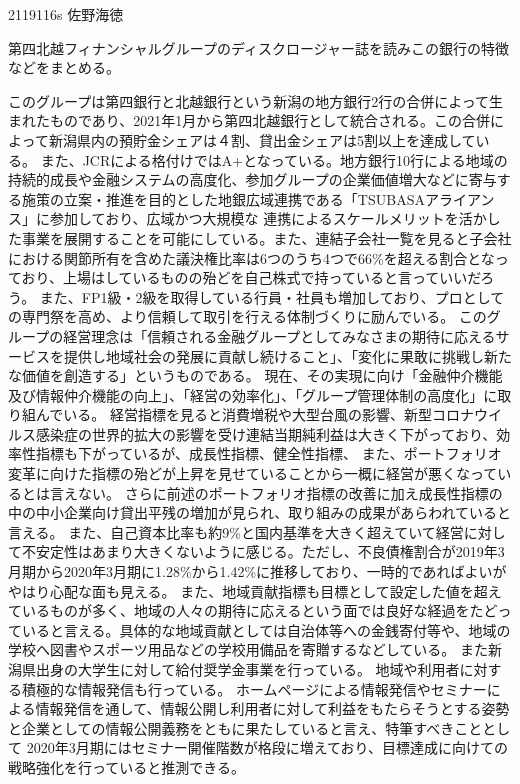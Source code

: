 \documentclass[11pt]{jsarticle}
\begin{document}
    2119116s 佐野海徳
    \par 第四北越フィナンシャルグループのディスクロージャー誌を読みこの銀行の特徴などをまとめる。
    \par このグループは第四銀行と北越銀行という新潟の地方銀行2行の合併によって生まれたものであり、2021年1月から第四北越銀行として統合される。この合併によって新潟県内の預貯金シェアは４割、貸出金シェアは5割以上を達成している。
    また、JCRによる格付けではA+となっている。地方銀行10行による地域の持続的成長や金融システムの高度化、参加グループの企業価値増大などに寄与する施策の立案・推進を目的とした地銀広域連携である「TSUBASAアライアンス」に参加しており、広域かつ大規模な
    連携によるスケールメリットを活かした事業を展開することを可能にしている。また、連結子会社一覧を見ると子会社における関節所有を含めた議決権比率は6つのうち4つで66\%を超える割合となっており、上場はしているものの殆どを自己株式で持っていると言っていいだろう。
    また、FP1級・2級を取得している行員・社員も増加しており、プロとしての専門祭を高め、より信頼して取引を行える体制づくりに励んでいる。
    このグループの経営理念は「信頼される金融グループとしてみなさまの期待に応えるサービスを提供し地域社会の発展に貢献し続けること」、「変化に果敢に挑戦し新たな価値を創造する」というものである。
    現在、その実現に向け「金融仲介機能及び情報仲介機能の向上」、「経営の効率化」、「グループ管理体制の高度化」に取り組んでいる。
    経営指標を見ると消費増税や大型台風の影響、新型コロナウイルス感染症の世界的拡大の影響を受け連結当期純利益は大きく下がっており、効率性指標も下がっているが、成長性指標、健全性指標、
    また、ポートフォリオ変革に向けた指標の殆どが上昇を見せていることから一概に経営が悪くなっているとは言えない。
    さらに前述のポートフォリオ指標の改善に加え成長性指標の中の中小企業向け貸出平残の増加が見られ、取り組みの成果があらわれていると言える。
    また、自己資本比率も約9\%と国内基準を大きく超えていて経営に対して不安定性はあまり大きくないように感じる。ただし、不良債権割合が2019年3月期から2020年3月期に1.28\%から1.42\%に推移しており、一時的であればよいがやはり心配な面も見える。
    また、地域貢献指標も目標として設定した値を超えているものが多く、地域の人々の期待に応えるという面では良好な経過をたどっていると言える。具体的な地域貢献としては自治体等への金銭寄付等や、地域の学校へ図書やスポーツ用品などの学校用備品を寄贈するなどしている。
    また新潟県出身の大学生に対して給付奨学金事業を行っている。
    地域や利用者に対する積極的な情報発信も行っている。
    ホームページによる情報発信やセミナーによる情報発信を通して、情報公開し利用者に対して利益をもたらそうとする姿勢と企業としての情報公開義務をともに果たしていると言え、特筆すべきこととして
    2020年3月期にはセミナー開催階数が格段に増えており、目標達成に向けての戦略強化を行っていると推測できる。
\end{document}
